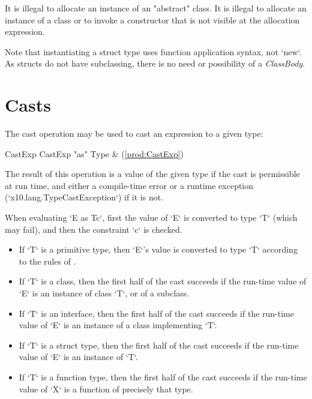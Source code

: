 It is illegal to allocate an instance of an \xcd"abstract" class.
It is illegal to allocate an instance of a class or to invoke a
constructor that is not visible at
the allocation expression.

Note that instantiating a struct type uses function application syntax, not
\xcd`new`.  As structs do not have subclassing, there is no need or
possibility of a {\em ClassBody}.


\section{Casts}\label{ClassCast}

The cast operation may be used to cast an expression to a given type:

\begin{bbgrammar}
 CastExp    \: 
     CastExp \xcd"as" Type & (\ref{prod:CastExp})\\%
\end{bbgrammar}

The result of this operation is a value of the given type if the cast
is permissible at run time, and either a compile-time error or a runtime
exception 
(\xcd`x10.lang.TypeCastException`) if it is not.  

When evaluating \xcd`E as T{c}`, first the value of \xcd`E` is converted to
type \xcd`T` (which may fail), and then the constraint \xcd`{c}` is checked. 



\begin{itemize}
\item If \xcd`T` is a primitive type, then \xcd`E`'s value is converted to type
      \xcd`T` according to the rules of
      . 
      
\item If \xcd`T` is a class, then the first half of the cast succeeds if the
      run-time value of \xcd`E` is an instance of class \xcd`T`, or of a
      subclass. 

\item If \xcd`T` is an interface, then the first half of the cast succeeds if
      the run-time value of \xcd`E` is an instance of a class implementing
      \xcd`T`. 

\item If \xcd`T` is a struct type, then the first half of the cast succeeds if
      the run-time value of \xcd`E` is an instance of \xcd`T`.  

\item If \xcd`T` is a function type, then the first half of the cast succeeds
      if the run-time value of \xcd`X` is a function of precisely that type.
\end{itemize}

